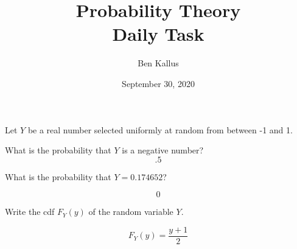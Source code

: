 \documentclass[12pt]{article}
\title{Probability Theory \\ Daily Task}
\author{Ben Kallus}
\date{September 30, 2020}
\begin{document}
\maketitle

Let $Y$ be a real number selected uniformly at random from between -1 and 1.

 What is the probability that $Y$ is a negative number?
    $$.5$$
    
 What is the probability that $Y = 0.174652$?

    $$0$$
    
 Write the cdf $F_Y(y)$ of the  random variable $Y$.

    $$F_Y(y) = \frac{y + 1}{2}$$
\end{document}
